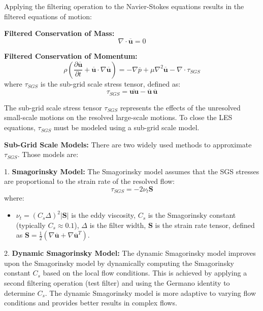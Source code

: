 Applying the filtering operation to the Navier-Stokes equations results in the filtered equations of motion:

\textbf{Filtered Conservation of Mass:}
\begin{equation}
\nabla \cdot \overline{\mathbf{u}} = 0
\end{equation}

\textbf{Filtered Conservation of Momentum:}
\begin{equation}
\rho \left( \frac{\partial \overline{\mathbf{u}}}{\partial t} + \overline{\mathbf{u}} \cdot \nabla \overline{\mathbf{u}} \right) = -\nabla \overline{p} + \mu \nabla^2 \overline{\mathbf{u}} - \nabla \cdot \tau_{SGS}
\end{equation}
where $\tau_{SGS}$ is the sub-grid scale stress tensor, defined as:
\begin{subequations}
    \begin{equation}
    \tau_{SGS} = \overline{\mathbf{u} \mathbf{u}} - \overline{\mathbf{u}} \, \overline{\mathbf{u}}
    \end{equation}
\end{subequations}
    

The sub-grid scale stress tensor $\tau_{SGS}$ represents the effects of the unresolved small-scale motions on the resolved large-scale motions. To close the LES equations, $\tau_{SGS}$ must be modeled using a sub-grid scale model.

\textbf{Sub-Grid Scale Models:}
There are two widely used methods to approximate $\tau_{SGS}$. Those models are:

1. \textbf{Smagorinsky Model:}
   The Smagorinsky model assumes that the SGS stresses are proportional to the strain rate of the resolved flow:
   \begin{equation}
   \tau_{SGS} = -2 \nu_t \mathbf{S}
   \end{equation}
   where:
   \begin{itemize}
       \item $\nu_t = (C_s \Delta)^2 |\mathbf{S}|$ is the eddy viscosity, $C_s$ is the Smagorinsky constant (typically $C_s \approx 0.1$), $\Delta$ is the filter width, $\mathbf{S}$ is the strain rate tensor, defined as $\mathbf{S} = \frac{1}{2} \left( \nabla \overline{\mathbf{u}} + \nabla \overline{\mathbf{u}}^T \right)$.
   \end{itemize}

2. \textbf{Dynamic Smagorinsky Model:}
   The dynamic Smagorinsky model improves upon the Smagorinsky model by dynamically computing the Smagorinsky constant $C_s$ based on the local flow conditions. 
   This is achieved by applying a second filtering operation (test filter) and using the Germano identity to determine $C_s$.
    The dynamic Smagorinsky model is more adaptive to varying flow conditions and provides better results in complex flows.


